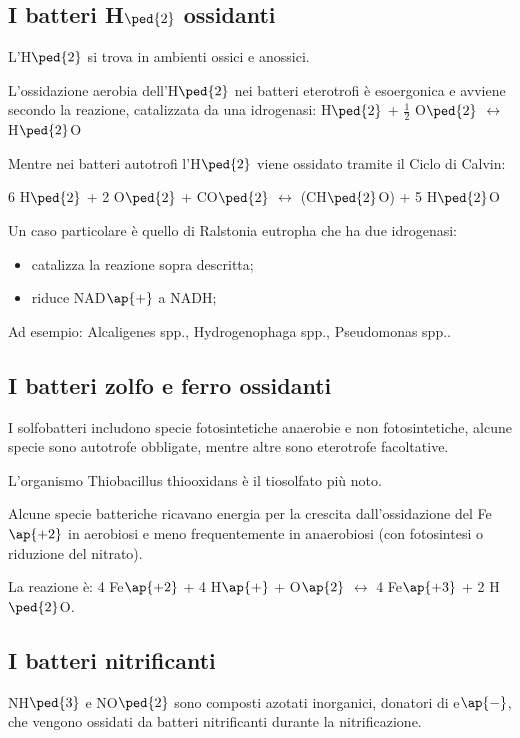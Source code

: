 \documentclass[11pt]{book}
\begin{document}
\subsection{I batteri H$\ped{2}$ ossidanti} 
L’H$\ped{2}$ si trova in ambienti ossici e anossici.

L’ossidazione aerobia dell’H$\ped{2}$ nei batteri eterotrofi è esoergonica e avviene secondo la reazione, catalizzata da una idrogenasi: 
H$\ped{2}$ + $\frac{1}{2}$ O$\ped{2}$ $\longleftrightarrow$ H$\ped{2}$O 

Mentre nei batteri autotrofi l’H$\ped{2}$ viene ossidato tramite il Ciclo di Calvin: 

6 H$\ped{2}$ + 2 O$\ped{2}$ + CO$\ped{2}$ $\longleftrightarrow$ (CH$\ped{2}$O) + 5 H$\ped{2}$O 

Un caso particolare è quello di Ralstonia eutropha che ha due idrogenasi: 
\begin{itemize}
\item catalizza la reazione sopra descritta;
\item riduce NAD$\ap{+}$ a NADH;
\end{itemize}

Ad esempio: Alcaligenes spp., Hydrogenophaga spp., Pseudomonas spp..

\subsection{I batteri zolfo e ferro ossidanti}
I solfobatteri includono specie fotosintetiche anaerobie e non fotosintetiche, alcune specie sono autotrofe obbligate, mentre altre sono eterotrofe facoltative.

L'organismo Thiobacillus thiooxidans è il tiosolfato più noto.

Alcune specie batteriche ricavano energia per la crescita dall’ossidazione del Fe$\ap{+2}$ in aerobiosi e meno frequentemente in anaerobiosi (con fotosintesi o riduzione del nitrato). 

La reazione è:
4 Fe$\ap{+2}$ + 4 H$\ap{+}$ + O$\ap{2}$ $\longleftrightarrow$ 4 Fe$\ap{+3}$ + 2 H$\ped{2}$O.


\subsection{I batteri nitrificanti} 
NH$\ped{3}$ e NO$\ped{2}$ sono composti azotati inorganici, donatori di e$\ap{-}$, che vengono ossidati da batteri nitrificanti durante la nitrificazione.
\end{document}
